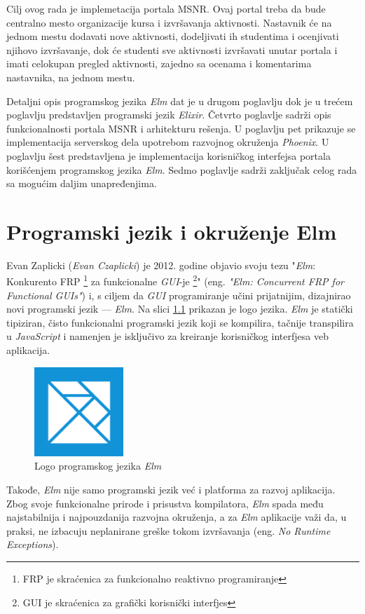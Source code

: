 \documentclass[12pt,oneside]{memoir}
\begin{document}
Cilj ovog rada je implemetacija portala MSNR.
Ovaj portal treba da bude centralno mesto organizacije kursa i izvršavanja aktivnosti.
Nastavnik će na jednom mestu dodavati nove aktivnosti, dodeljivati ih studentima i ocenjivati
njihovo izvršavanje, dok će studenti sve aktivnosti izvršavati unutar portala i imati celokupan
pregled aktivnosti, zajedno sa ocenama i komentarima nastavnika, na jednom mestu.

Detaljni opis programskog jezika \emph{Elm} dat je u drugom poglavlju dok je u trećem poglavlju predstavljen programski jezik \emph{Elixir}.
Četvrto poglavlje sadrži opis funkcionalnosti portala MSNR i arhitekturu rešenja.
U poglavlju pet prikazuje se implementacija serverskog dela upotrebom razvojnog
okruženja \emph{Phoenix}. U poglavlju šest predstavljena je implementacija korisničkog interfejsa
portala korišćenjem programskog jezika \emph{Elm}. Sedmo poglavlje sadrži zaključak celog rada sa
mogućim daljim unapređenjima.

\chapter{Programski jezik i okruženje Elm}
Evan Zaplicki (\emph{Evan Czaplicki}) je 2012. godine objavio svoju tezu "\emph{Elm}: Konkurento FRP
\footnote{FRP je skraćenica za funkcionalno reaktivno programiranje} za funkcionalne \emph{GUI}-je
\footnote{GUI je skraćenica za grafički korisnički interfjes}" (eng. \emph{"Elm: Concurrent
FRP for Functional GUIs"}) \cite{elm:2012} i, s ciljem da \emph{GUI} programiranje učini
prijatnijim, dizajnirao novi programski jezik --- \emph{Elm}. Na slici \ref{fig:elm-logo} prikazan
je logo jezika.
\emph{Elm} je statički tipiziran, čisto funkcionalni programski jezik koji se
kompilira, tačnije transpilira u \emph{JavaScript} i namenjen je isključivo za
kreiranje korisničkog interfjesa veb aplikacija.
\begin{figure}[!ht]
  \centering
  \includegraphics[width=0.3\textwidth]{elm.png}
  \caption{Logo programskog jezika \emph{Elm}}
  \label{fig:elm-logo}
\end{figure}
Takođe, \emph{Elm} nije samo programski jezik već i platforma za razvoj aplikacija.
Zbog svoje funkcionalne prirode i prisustva kompilatora, \emph{Elm} spada među
najstabilnija i najpouzdanija razvojna okruženja, a za \emph{Elm} aplikacije važi
da, u praksi, ne izbacuju neplanirane greške tokom izvršavanja (eng. \emph{No 
Runtime Exceptions}).
\end{document}
